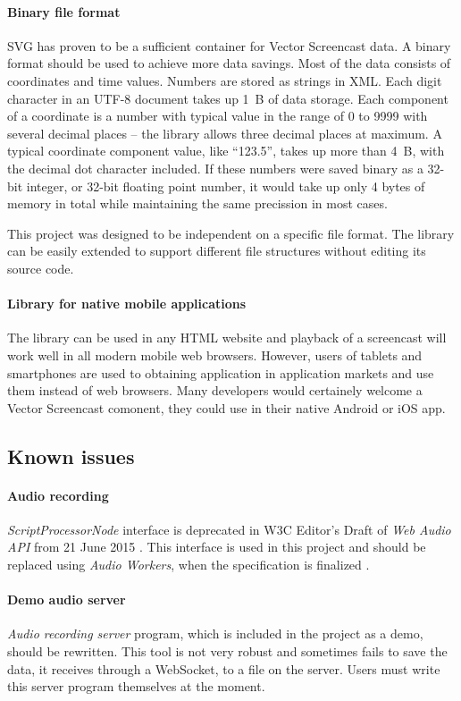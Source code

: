 \paragraph{Binary file format}
SVG has proven to be a sufficient container for Vector Screencast data. A binary format should be used to achieve more data savings. Most of the data consists of coordinates and time values. Numbers are stored as strings in XML. Each digit character in an UTF-8 document takes up 1~B of data storage. Each component of a coordinate is a number with typical value in the range of 0 to 9999 with several decimal places -- the library allows three decimal places at maximum. A typical coordinate component value, like ``123.5'', takes up more than 4~B, with the decimal dot character included. If these numbers were saved binary as a 32-bit integer, or 32-bit floating point number, it would take up only 4 bytes of memory in total while maintaining the same precission in most cases.

This project was designed to be independent on a specific file format. The library can be easily extended to support different file structures without editing its source code.

\paragraph{Library for native mobile applications}
The library can be used in any HTML website and playback of a screencast will work well in all modern mobile web browsers. However, users of tablets and smartphones are used to obtaining application in application markets and use them instead of web browsers. Many developers would certainely welcome a Vector Screencast comonent, they could use in their native Android or iOS app. 


\subsection*{Known issues}
\paragraph{Audio recording} \textit{ScriptProcessorNode} interface is deprecated in W3C Editor's Draft of \textit{Web Audio API} from 21 June 2015 \cite{mic_deprecated}. This interface is used in this project and should be replaced using \textit{Audio Workers}, when the specification is finalized \cite{audio_worker}. 

\paragraph{Demo audio server} \textit{Audio recording server} program, which is included in the project as a demo, should be rewritten. This tool is not very robust and sometimes fails to save the data, it receives through a WebSocket, to a file on the server. Users must write this server program themselves at the moment.